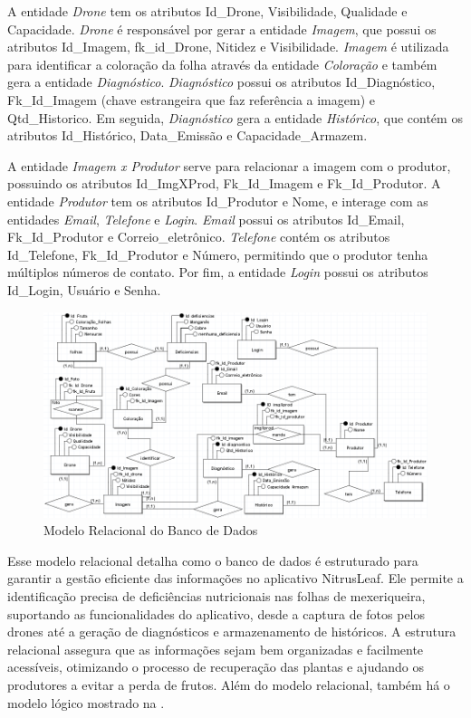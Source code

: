 \documentclass[
    a4paper,%
    12pt,%
    english,%
    brazilian,%
]{article}
\begin{document}
A entidade \textit{Drone} tem os atributos Id\_Drone, Visibilidade, Qualidade e Capacidade. \textit{Drone} é responsável por gerar a entidade \textit{Imagem}, que possui os atributos Id\_Imagem, fk\_id\_Drone, Nitidez e Visibilidade. \textit{Imagem} é utilizada para identificar a coloração da folha através da entidade \textit{Coloração} e também gera a entidade \textit{Diagnóstico}. \textit{Diagnóstico} possui os atributos Id\_Diagnóstico, Fk\_Id\_Imagem (chave estrangeira que faz referência a imagem) e Qtd\_Historico. Em seguida, \textit{Diagnóstico} gera a entidade \textit{Histórico}, que contém os atributos Id\_Histórico, Data\_Emissão e Capacidade\_Armazem.

A entidade \textit{Imagem x Produtor} serve para relacionar a imagem com o produtor, possuindo os atributos Id\_ImgXProd, Fk\_Id\_Imagem e Fk\_Id\_Produtor. A entidade \textit{Produtor} tem os atributos Id\_Produtor e Nome, e interage com as entidades \textit{Email}, \textit{Telefone} e \textit{Login}. \textit{Email} possui os atributos Id\_Email, Fk\_Id\_Produtor e Correio\_eletrônico. \textit{Telefone} contém os atributos Id\_Telefone, Fk\_Id\_Produtor e Número, permitindo que o produtor tenha múltiplos números de contato. Por fim, a entidade \textit{Login} possui os atributos Id\_Login, Usuário e Senha.

\begin{figure}[H]
    \centering
    \caption{Modelo Relacional do Banco de Dados}%
    \label{fig:mbdrelacional}
    \includegraphics[width=0.8\linewidth]{Logos/mbdrelacional.png}
    \end{figure}

Esse modelo relacional detalha como o banco de dados é estruturado para garantir a gestão eficiente das informações no aplicativo NitrusLeaf. Ele permite a identificação precisa de deficiências nutricionais nas folhas de mexeriqueira, suportando as funcionalidades do aplicativo, desde a captura de fotos pelos drones até a geração de diagnósticos e armazenamento de históricos. A estrutura relacional assegura que as informações sejam bem organizadas e facilmente acessíveis, otimizando o processo de recuperação das plantas e ajudando os produtores a evitar a perda de frutos. Além do modelo relacional, também há o modelo lógico mostrado na .
\end{document}
